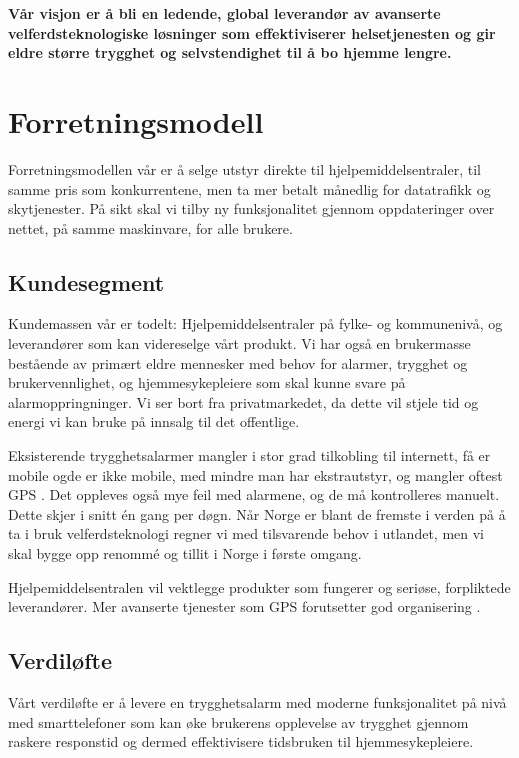 \textbf{Vår visjon er å bli en ledende, global leverandør av avanserte
velferdsteknologiske løsninger som effektiviserer helsetjenesten og gir eldre
større trygghet og selvstendighet til å bo hjemme lengre.}

\section{Forretningsmodell}

Forretningsmodellen vår er å selge utstyr direkte til hjelpemiddelsentraler,
til samme pris som konkurrentene, men ta mer betalt månedlig for datatrafikk og
skytjenester.  På sikt skal vi tilby ny funksjonalitet gjennom oppdateringer
over nettet, på samme maskinvare, for alle brukere.

\subsection{Kundesegment}

Kundemassen vår er todelt: Hjelpemiddelsentraler på fylke- og kommunenivå, og
leverandører som kan videreselge vårt produkt.  Vi har også en brukermasse
bestående av primært eldre mennesker med behov for alarmer, trygghet og
brukervennlighet, og hjemmesykepleiere som skal kunne svare på
alarmoppringninger.  Vi ser bort fra privatmarkedet, da dette vil stjele tid og
energi vi kan bruke på innsalg til det offentlige.

Eksisterende trygghetsalarmer mangler i stor grad tilkobling til internett, få
er mobile ogde er ikke mobile, med mindre man har ekstrautstyr, og mangler
oftest GPS \cite{sverige.alarm}.  Det oppleves også mye feil med alarmene,
og de må kontrolleres manuelt. Dette skjer i snitt én gang per døgn. Når Norge
er blant de fremste i verden på å ta i bruk velferdsteknologi
\cite{telenor.undersokelse} regner vi med tilsvarende behov i utlandet, men vi
skal bygge opp renommé og tillit i Norge i første omgang.

Hjelpemiddelsentralen vil vektlegge produkter som fungerer og seriøse,
forpliktede leverandører. Mer avanserte tjenester som GPS forutsetter god
organisering \cite{org.alarmmottak}.

\subsection{Verdiløfte}

Vårt verdiløfte er å levere en trygghetsalarm med moderne funksjonalitet på
nivå med smarttelefoner som kan øke brukerens opplevelse av trygghet gjennom
raskere responstid og dermed effektivisere tidsbruken til hjemmesykepleiere.

